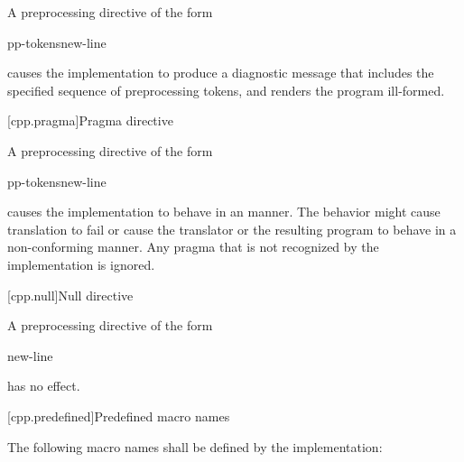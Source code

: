 \pnum
A preprocessing directive of the form

\begin{ncsimplebnf}
 pp-tokens\opt new-line
\end{ncsimplebnf}

causes the implementation to produce
a diagnostic message that includes the specified sequence of preprocessing tokens,
and renders the program ill-formed.

[cpp.pragma]{Pragma directive}%
%

\pnum
A preprocessing directive of the form

\begin{ncsimplebnf}
 pp-tokens\opt new-line
\end{ncsimplebnf}

causes the implementation to behave
in an  manner.
The behavior might cause translation to fail or cause the translator or
the resulting program to behave in a non-conforming manner.
Any pragma that is not recognized by the implementation is ignored.

[cpp.null]{Null directive}%

\pnum
A preprocessing directive of the form

\begin{ncsimplebnf}
\terminal{\#} new-line
\end{ncsimplebnf}

has no effect.

[cpp.predefined]{Predefined macro names}
%

\pnum
The following macro names shall be defined by the implementation:

